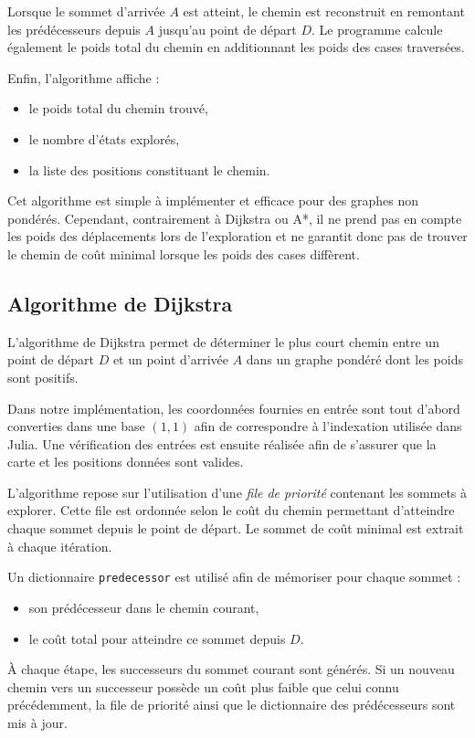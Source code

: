 \documentclass[a4paper,12pt]{article}
\begin{document}
Lorsque le sommet d'arrivée $A$ est atteint, le chemin est reconstruit en remontant les prédécesseurs depuis $A$ jusqu'au point de départ $D$. Le programme calcule également le poids total du chemin en additionnant les poids des cases traversées.

Enfin, l'algorithme affiche :
\begin{itemize}
\item le poids total du chemin trouvé,
\item le nombre d'états explorés,
\item la liste des positions constituant le chemin.
\end{itemize}

Cet algorithme est simple à implémenter et efficace pour des graphes non pondérés. Cependant, contrairement à Dijkstra ou A*, il ne prend pas en compte les poids des déplacements lors de l'exploration et ne garantit donc pas de trouver le chemin de coût minimal lorsque les poids des cases diffèrent.


\subsection{Algorithme de Dijkstra}

L’algorithme de Dijkstra permet de déterminer le plus court chemin entre un point de départ $D$ et un point d’arrivée $A$ dans un graphe pondéré dont les poids sont positifs.

Dans notre implémentation, les coordonnées fournies en entrée sont tout d’abord converties dans une base $(1,1)$ afin de correspondre à l’indexation utilisée dans Julia. Une vérification des entrées est ensuite réalisée afin de s’assurer que la carte et les positions données sont valides.

L’algorithme repose sur l’utilisation d’une \textit{file de priorité} contenant les sommets à explorer. Cette file est ordonnée selon le coût du chemin permettant d’atteindre chaque sommet depuis le point de départ. Le sommet de coût minimal est extrait à chaque itération.

Un dictionnaire \texttt{predecessor} est utilisé afin de mémoriser pour chaque sommet :
\begin{itemize}
\item son prédécesseur dans le chemin courant,
\item le coût total pour atteindre ce sommet depuis $D$.
\end{itemize}

À chaque étape, les successeurs du sommet courant sont générés. Si un nouveau chemin vers un successeur possède un coût plus faible que celui connu précédemment, la file de priorité ainsi que le dictionnaire des prédécesseurs sont mis à jour.
\end{document}
